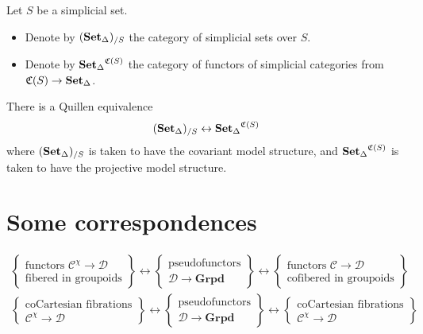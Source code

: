 \documentclass[main.tex]{subfiles}
\begin{document}
Let $S$ be a simplicial set.
\begin{itemize}
  \item Denote by $(\operatorname{\mathbf{Set}_{\Delta}})_{/S}$ the category of simplicial sets over $S$.

  \item Denote by $\operatorname{\mathbf{Set}_{\Delta}}^{\mathfrak{C}(S)}$ the category of functors of simplicial categories from $\mathfrak{C}(S) \to \operatorname{\mathbf{Set}_{\Delta}}$.
\end{itemize}

\begin{theorem}
  There is a Quillen equivalence
  \begin{equation*}
    (\operatorname{\mathbf{Set}_{\Delta}})_{/S} \leftrightarrow \operatorname{\mathbf{Set}_{\Delta}}^{\mathfrak{C}(S)}
  \end{equation*}
  where $(\operatorname{\mathbf{Set}_{\Delta}})_{/S}$ is taken to have the covariant model structure, and $\operatorname{\mathbf{Set}_{\Delta}}^{\mathfrak{C}(S)}$ is taken to have the projective model structure.
\end{theorem}

\section{Some correspondences}
\label{sec:some_correspondences}

\begin{gather*}
  \left\{ \substack{\text{functors }\mathcal{C}^{\chi} \to \mathcal{D} \\ \text{fibered in groupoids}} \right\} \longleftrightarrow \left\{\substack{\text{pseudofunctors} \\ \mathcal{D} \to \mathbf{Grpd}}\right\} \longleftrightarrow \left\{ \substack{\text{functors }\mathcal{C} \to \mathcal{D} \\ \text{cofibered in groupoids}} \right\} \\
  \left\{ \substack{\text{coCartesian fibrations}\\\mathcal{C}^{\chi} \to \mathcal{D}} \right\} \longleftrightarrow \left\{\substack{\text{pseudofunctors} \\ \mathcal{D} \to \mathbf{Grpd}}\right\} \longleftrightarrow \left\{ \substack{\text{coCartesian fibrations}\\\mathcal{C}^{\chi} \to \mathcal{D}} \right\}
\end{gather*}
\end{document}
